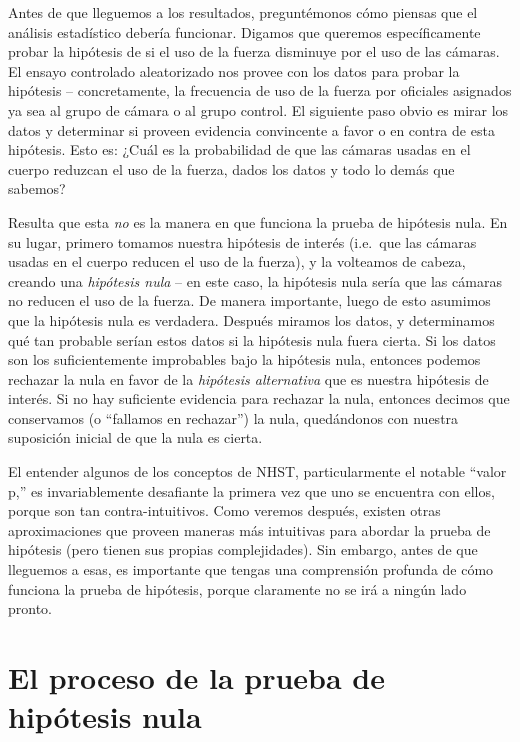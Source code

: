\documentclass[
  12pt,
]{book}
\begin{document}
Antes de que lleguemos a los resultados, preguntémonos cómo piensas que el análisis estadístico debería funcionar. Digamos que queremos específicamente probar la hipótesis de si el uso de la fuerza disminuye por el uso de las cámaras. El ensayo controlado aleatorizado nos provee con los datos para probar la hipótesis -- concretamente, la frecuencia de uso de la fuerza por oficiales asignados ya sea al grupo de cámara o al grupo control. El siguiente paso obvio es mirar los datos y determinar si proveen evidencia convincente a favor o en contra de esta hipótesis. Esto es: ¿Cuál es la probabilidad de que las cámaras usadas en el cuerpo reduzcan el uso de la fuerza, dados los datos y todo lo demás que sabemos?

Resulta que esta \emph{no} es la manera en que funciona la prueba de hipótesis nula. En su lugar, primero tomamos nuestra hipótesis de interés (i.e.~que las cámaras usadas en el cuerpo reducen el uso de la fuerza), y la volteamos de cabeza, creando una \emph{hipótesis nula} -- en este caso, la hipótesis nula sería que las cámaras no reducen el uso de la fuerza. De manera importante, luego de esto asumimos que la hipótesis nula es verdadera. Después miramos los datos, y determinamos qué tan probable serían estos datos si la hipótesis nula fuera cierta. Si los datos son los suficientemente improbables bajo la hipótesis nula, entonces podemos rechazar la nula en favor de la \emph{hipótesis alternativa} que es nuestra hipótesis de interés. Si no hay suficiente evidencia para rechazar la nula, entonces decimos que conservamos (o ``fallamos en rechazar'') la nula, quedándonos con nuestra suposición inicial de que la nula es cierta.

El entender algunos de los conceptos de NHST, particularmente el notable ``valor p,'' es invariablemente desafiante la primera vez que uno se encuentra con ellos, porque son tan contra-intuitivos. Como veremos después, existen otras aproximaciones que proveen maneras más intuitivas para abordar la prueba de hipótesis (pero tienen sus propias complejidades). Sin embargo, antes de que lleguemos a esas, es importante que tengas una comprensión profunda de cómo funciona la prueba de hipótesis, porque claramente no se irá a ningún lado pronto.

\hypertarget{el-proceso-de-la-prueba-de-hipuxf3tesis-nula}{%
\section{El proceso de la prueba de hipótesis nula}\label{el-proceso-de-la-prueba-de-hipuxf3tesis-nula}}
\end{document}
